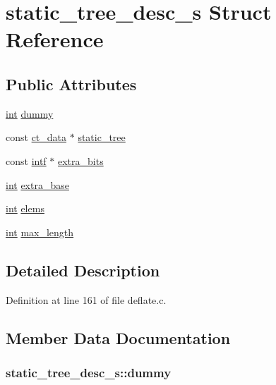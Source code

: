 \hypertarget{structstatic__tree__desc__s}{\section{static\-\_\-tree\-\_\-desc\-\_\-s Struct Reference}
\label{structstatic__tree__desc__s}
}
\subsection*{Public Attributes}
\begin{DoxyCompactItemize}
\item 
\hyperlink{ioapi_8h_a787fa3cf048117ba7123753c1e74fcd6}{int} \hyperlink{structstatic__tree__desc__s_aa3662e0ed40c86de246851a7a2483308}{dummy}
\item 
const \hyperlink{deflate_8h_a0a4b5df3b2254c627b8a59e038963118}{ct\-\_\-data} $\ast$ \hyperlink{structstatic__tree__desc__s_a56265073858de4ffe99e32d0f9d38545}{static\-\_\-tree}
\item 
const \hyperlink{zconf_8h_aa857123283d7630b35e9b1d427dd6438}{intf} $\ast$ \hyperlink{structstatic__tree__desc__s_a4ec9abd624cbf2bfcc48dfb786925986}{extra\-\_\-bits}
\item 
\hyperlink{ioapi_8h_a787fa3cf048117ba7123753c1e74fcd6}{int} \hyperlink{structstatic__tree__desc__s_a1051cc83d9d410ccf21427df9bd85201}{extra\-\_\-base}
\item 
\hyperlink{ioapi_8h_a787fa3cf048117ba7123753c1e74fcd6}{int} \hyperlink{structstatic__tree__desc__s_ab4bad1c091188c43413a09f626a5787f}{elems}
\item 
\hyperlink{ioapi_8h_a787fa3cf048117ba7123753c1e74fcd6}{int} \hyperlink{structstatic__tree__desc__s_ae767848725194f63fa9cf08142767ad4}{max\-\_\-length}
\end{DoxyCompactItemize}


\subsection{Detailed Description}


Definition at line 161 of file deflate.\-c.



\subsection{Member Data Documentation}
\hypertarget{structstatic__tree__desc__s_aa3662e0ed40c86de246851a7a2483308}{
\subsubsection[{dummy}]{ static\-\_\-tree\-\_\-desc\-\_\-s\-::dummy}}\label{structstatic__tree__desc__s_aa3662e0ed40c86de246851a7a2483308}


